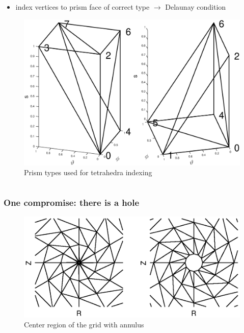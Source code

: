 \documentclass{beamer}
\begin{document}
\begin{frame}
\begin{columns}[onlytextwidth]
\begin{column}{0.5\textwidth}
	\vspace{0cm}
	\begin{center}
		\begin{itemize}
			\item index vertices to prism face of correct type \newline
			$\rightarrow$ Delaunay condition 
		\end{itemize}
		\begin{figure}
			\includegraphics[trim={0cm 0cm 0cm 0cm},clip,width=1\textwidth]{FIGURES/2Prisms_comparison.eps}
			\caption{Prism types used for tetrahedra indexing}
		\end{figure}
	\end{center}
\end{column}
\end{columns}
\end{frame}

\begin{frame}
\frametitle{One compromise: there is a hole}
\vspace{-1.2cm}
		\begin{center}
			\begin{figure}
				\includegraphics[trim={1cm 2cm 1cm 2cm},clip,width=1\textwidth]{FIGURES/Comparison_smin_annulus.eps}
				\caption{Center region of the grid with annulus}
			\end{figure}
		\end{center}
\end{frame}
\end{document}
